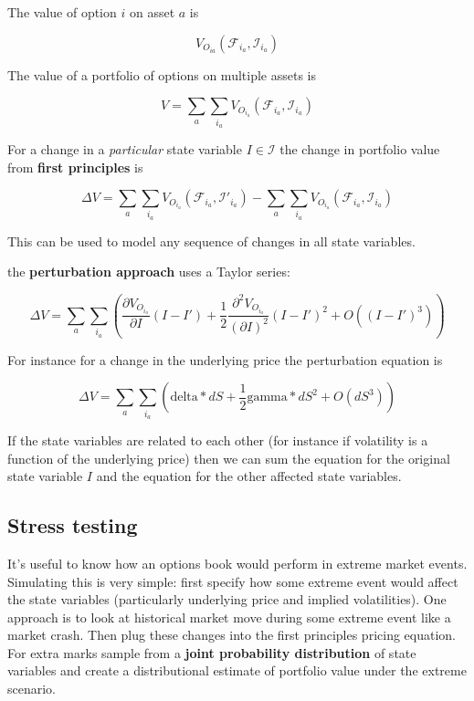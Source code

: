 The value of option $i$ on asset $a$ is

\[V_{O_{ia}}(\mathcal{F}_{i_a},\mathcal{I}_{i_a}) \]

The value of a portfolio of options on multiple assets is

\[V = \sum_{a}\sum_{i_a}V_{O_{i_a}}(\mathcal{F}_{i_a},\mathcal{I}_{i_a}) \]

For a change in a \textit{particular} state variable $I \in \mathcal{I}$ the change in portfolio value from \textbf{first principles} is

\[ \Delta V =  \sum_{a}\sum_{i_a}V_{O_{i_a}}(\mathcal{F}_{i_a},\mathcal{I'}_{i_a}) - \sum_{a}\sum_{i_a}V_{O_{i_a}}(\mathcal{F}_{i_a},\mathcal{I}_{i_a})  \]

This can be used to model any sequence of changes in all state variables. 
 
 the \textbf{perturbation approach} uses a Taylor series:
 
 \[ \Delta V  = \sum_{a}\sum_{i_a}  \left(  \frac{ \partial V_{O_{i_a}}}{\partial I}(I-I') + \frac{1}{2}\frac{\partial^2 V_{O_{i_a}}}{(\partial I)^2}(I-I')^2 + O((I-I')^3)  \right)  \]
 
 For instance for a change in the underlying price the perturbation equation is

 \[ \Delta V  = \sum_{a}\sum_{i_a}  \left(  \mbox{delta}*dS + \frac{1}{2}\mbox{gamma}*dS^2 + O(dS^3)  \right)  \]

If the state variables are related to each other (for instance if volatility is a function of the underlying price) then we can sum the equation for the original state variable $I$ and the equation for the other affected state variables.

\subsection{Stress testing}

It's useful to know how an options book would perform in extreme market events. Simulating this is very simple: first specify how some extreme event would affect the state variables (particularly underlying price and implied volatilities). One approach is to look at historical market move during some extreme event like a market crash. Then plug these changes into the first principles pricing equation. For extra marks sample from a \textbf{joint probability distribution} of state variables and create a distributional estimate of portfolio value under the extreme scenario. 

